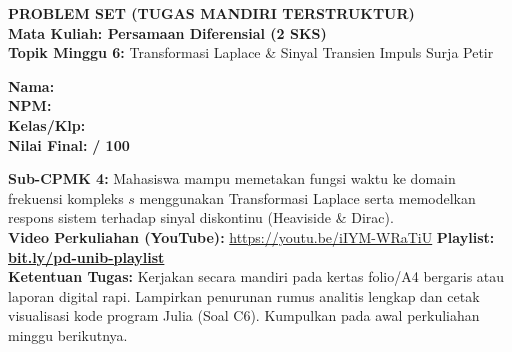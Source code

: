 \documentclass[10pt,a4paper]{article}
\begin{document}
\noindent\begin{minipage}[c]{0.68\textwidth}%
  {\large\textbf{\color{unibblue}PROBLEM SET (TUGAS MANDIRI TERSTRUKTUR)}}\\[1mm]
  {\normalsize\textbf{Mata Kuliah: Persamaan Diferensial (2 SKS)}}\\[0.5mm]
  {\small\textbf{Topik Minggu 6:} Transformasi Laplace \& Sinyal Transien Impuls Surja Petir}%
\end{minipage}%
\hfill%
\begin{minipage}[c]{0.30\textwidth}%
  \begin{tcolorbox}[colback=unibblue!5,colframe=unibblue,boxrule=0.6pt,arc=2pt,left=4pt,right=4pt,top=2pt,bottom=2pt]
    \scriptsize
    \textbf{Nama:} \dotfill\\[1.2mm]
    \textbf{NPM:} \dotfill\\[1.2mm]
    \textbf{Kelas/Klp:} \dotfill\\[1.2mm]
    \textbf{Nilai Final:} \hfill \textbf{/ 100}
  \end{tcolorbox}%
\end{minipage}\par

\vspace{1.5mm}

\begin{tcolorbox}[colback=boxbg,colframe=unibgold!90!black,boxrule=0.6pt,arc=2pt,left=5pt,right=5pt,top=3pt,bottom=3pt,title=\textbf{\scriptsize Capaian Pembelajaran (Sub-CPMK 4) \& Pedoman Pengerjaan Tugas}]
  \scriptsize
  \textbf{Sub-CPMK 4:} Mahasiswa mampu memetakan fungsi waktu ke domain frekuensi kompleks $s$ menggunakan Transformasi Laplace serta memodelkan respons sistem terhadap sinyal diskontinu (Heaviside \& Dirac).\\
  \textbf{Video Perkuliahan (YouTube):} \url{https://youtu.be/iIYM-WRaTiU} \hfill \textbf{Playlist:} \href{https://www.youtube.com/playlist?list=PLS5oOZWXZeTw}{\color{unibblue}\textbf{bit.ly/pd-unib-playlist}}\\\textbf{Ketentuan Tugas:} Kerjakan secara mandiri pada kertas folio/A4 bergaris atau laporan digital rapi. Lampirkan penurunan rumus analitis lengkap dan cetak visualisasi kode program Julia (Soal C6). Kumpulkan pada awal perkuliahan minggu berikutnya.
\end{tcolorbox}

\vspace{1.5mm}
\end{document}
